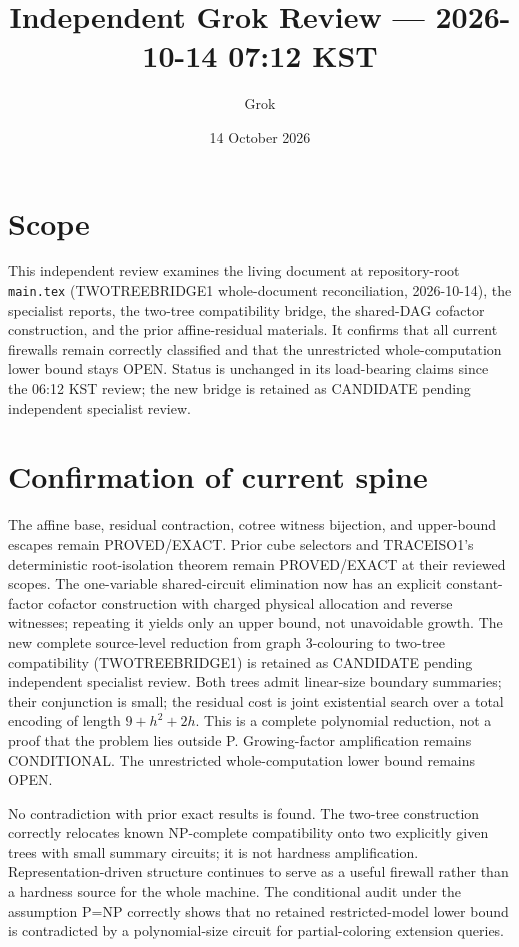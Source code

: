 \documentclass[11pt]{article}
\title{Independent Grok Review --- 2026-10-14 07:12 KST}
\author{Grok}
\date{14 October 2026}
\begin{document}
\maketitle

\begin{center}
\end{center}

\section{Scope}
This independent review examines the living document at repository-root \texttt{main.tex} (TWOTREEBRIDGE1 whole-document reconciliation, 2026-10-14), the specialist reports, the two-tree compatibility bridge, the shared-DAG cofactor construction, and the prior affine-residual materials. It confirms that all current firewalls remain correctly classified and that the unrestricted whole-computation lower bound stays OPEN. Status is unchanged in its load-bearing claims since the 06:12 KST review; the new bridge is retained as CANDIDATE pending independent specialist review.

\section{Confirmation of current spine}
The affine base, residual contraction, cotree witness bijection, and upper-bound escapes remain PROVED/EXACT. Prior cube selectors and TRACEISO1's deterministic root-isolation theorem remain PROVED/EXACT at their reviewed scopes. The one-variable shared-circuit elimination now has an explicit constant-factor cofactor construction with charged physical allocation and reverse witnesses; repeating it yields only an upper bound, not unavoidable growth. The new complete source-level reduction from graph 3-colouring to two-tree compatibility (TWOTREEBRIDGE1) is retained as CANDIDATE pending independent specialist review. Both trees admit linear-size boundary summaries; their conjunction is small; the residual cost is joint existential search over a total encoding of length \(9+h^2+2h\). This is a complete polynomial reduction, not a proof that the problem lies outside P. Growing-factor amplification remains CONDITIONAL. The unrestricted whole-computation lower bound remains OPEN.

No contradiction with prior exact results is found. The two-tree construction correctly relocates known NP-complete compatibility onto two explicitly given trees with small summary circuits; it is not hardness amplification. Representation-driven structure continues to serve as a useful firewall rather than a hardness source for the whole machine. The conditional audit under the assumption P=NP correctly shows that no retained restricted-model lower bound is contradicted by a polynomial-size circuit for partial-coloring extension queries.
\end{document}
